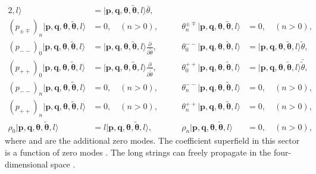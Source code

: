 \documentclass[a4paper,seceq,preprint]{ptptex}
\begin{document}
\begin{alignat}{2}
,l\rangle&=|\boldsymbol p,\boldsymbol q,
\boldsymbol\theta,\boldsymbol{\tilde\theta},l\rangle\bar\theta,
\nonumber\\
 (p_{\pm\mp})_n|\boldsymbol p,\boldsymbol q,
\boldsymbol\theta,\boldsymbol{\tilde\theta}
,l\rangle&=0,\quad (n> 0),&\qquad
 \theta^{\pm\mp}_n|\boldsymbol p,\boldsymbol q,
\boldsymbol\theta,\boldsymbol{\tilde\theta},l\rangle&=0,\quad (n>0),
\nonumber\\
 (p_{--})_0|\boldsymbol p,\boldsymbol q,
\boldsymbol\theta,\boldsymbol{\tilde\theta},l\rangle&=
|\boldsymbol p,\boldsymbol q,
\boldsymbol\theta,\boldsymbol{\tilde\theta}
,l\rangle\frac{\partial}{\partial\tilde\theta},&\qquad
 \theta^{--}_0|\boldsymbol p,\boldsymbol q,
\boldsymbol\theta,\boldsymbol{\tilde\theta}
,l\rangle&=|\boldsymbol p,\boldsymbol q,
\boldsymbol\theta,\boldsymbol{\tilde\theta},l\rangle
\tilde\theta,\nonumber\\
 (p_{++})_0|\boldsymbol p,\boldsymbol q,
\boldsymbol\theta,\boldsymbol{\tilde\theta},l\rangle&=
|\boldsymbol p,\boldsymbol q,\boldsymbol\theta,
\boldsymbol{\tilde\theta},l\rangle\frac{\partial}
{\partial\bar{\tilde\theta}},&\qquad
 \theta^{++}_0|\boldsymbol p,\boldsymbol q,
\boldsymbol\theta,\boldsymbol{\tilde\theta}
,l\rangle&=|\boldsymbol p,\boldsymbol q,
\boldsymbol\theta,\boldsymbol{\tilde\theta},l\rangle
 \bar{\tilde\theta},\nonumber\\
 (p_{--})_n|\boldsymbol p,\boldsymbol q,
\boldsymbol\theta,\boldsymbol{\tilde\theta}
,l\rangle&=0,\quad (n>0),&\qquad
 \theta^{--}_n|\boldsymbol p,\boldsymbol q,
\boldsymbol\theta,\boldsymbol{\tilde\theta},l\rangle&=0,\quad (n>0),
\nonumber\\
 (p_{++})_n|\boldsymbol p,\boldsymbol q,
\boldsymbol\theta,\boldsymbol{\tilde\theta}
,l\rangle&=0,\quad (n>0),&\qquad
 \theta^{++}_n|\boldsymbol p,\boldsymbol q,
\boldsymbol\theta,\boldsymbol{\tilde\theta},l\rangle&=0,\quad (n>0),
\nonumber\\
 \rho_0|\boldsymbol p,\boldsymbol q,
\boldsymbol\theta,\boldsymbol{\tilde\theta}
,l\rangle&=l|\boldsymbol p,\boldsymbol q,
\boldsymbol\theta,\boldsymbol{\tilde\theta}
,l\rangle,&\qquad
\rho_n|\boldsymbol p,\boldsymbol q,
\boldsymbol\theta,\boldsymbol{\tilde\theta}
,l\rangle&=0,\quad (n>0),
 \end{alignat} 
where \coordHE{} and \myHighlight{$\boldsymbol{\tilde\theta}=
(\tilde\theta,\bar{\tilde\theta})$}\coordHE{} are the additional zero modes.
The coefficient superfield in this sector is a function of 
zero modes \coordHE{}.
The long strings can freely propagate in the four-dimensional
space  \coordHE{}.
\end{document}
